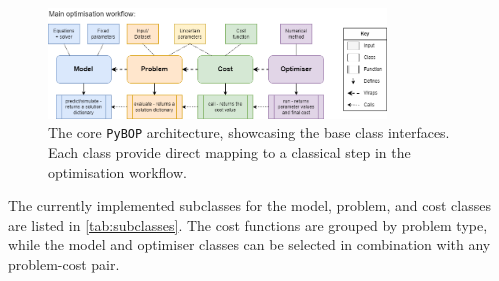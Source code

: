 \documentclass[
]{article}
\begin{document}
\begin{figure}
\centering
\includegraphics[width=0.8\textwidth,height=\textheight]{figures/PyBOP_components.drawio.png}
\caption{The core \texttt{PyBOP} architecture, showcasing the base class
interfaces. Each class provide direct mapping to a classical step in the
optimisation workflow. \label{fig:classes}}
\end{figure}

The currently implemented subclasses for the model, problem, and cost
classes are listed in \autoref{tab:subclasses}. The cost functions are
grouped by problem type, while the model and optimiser classes can be
selected in combination with any problem-cost pair.
\end{document}
